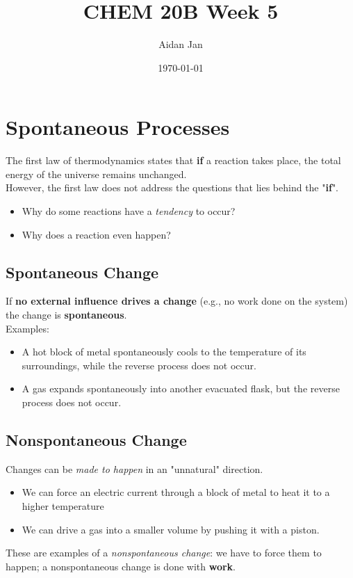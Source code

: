 \documentclass[10pt]{article}
\title{CHEM 20B Week 5}
\author{Aidan Jan}
\date{\today}
\begin{document}
\maketitle
\section*{Spontaneous Processes}
The first law of thermodynamics states that \textbf{if} a reaction takes place, the total energy of the universe remains unchanged.\\
However, the first law does not address the questions that lies behind the "\textbf{if}".
\begin{itemize}
    \item Why do some reactions have a \textit{tendency} to occur?
    \item Why does a reaction even happen?
\end{itemize}

\subsection*{Spontaneous Change}
If \textbf{no external influence drives a change} (e.g., no work done on the system) the change is \textbf{spontaneous}.\\
Examples:
\begin{itemize}
    \item A hot block of metal spontaneously cools to the temperature of its surroundings, while the reverse process does not occur.
    \item A gas expands spontaneously into another evacuated flask, but the reverse process does not occur.
\end{itemize}

\subsection*{Nonspontaneous Change}
Changes can be \textit{made to happen} in an "unnatural" direction.
\begin{itemize}
    \item We can force an electric current through a block of metal to heat it to a higher temperature
    \item We can drive a gas into a smaller volume by pushing it with a piston.
\end{itemize}
These are examples of a \textit{nonspontaneous change}: we have to force them to happen; a nonspontaneous change is done with \textbf{work}.
\end{document}
